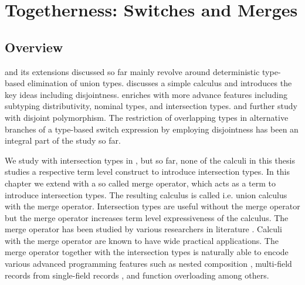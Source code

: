 
\chapter{Togetherness: Switches and Merges}
\label{chap:merge}






\section{Overview}
\name and its extensions discussed so far mainly
revolve around deterministic type-based elimination
of union types.  discusses a 
simple \name calculus and introduces the key ideas
including disjointness.  enriches 
\name with more advance features including subtyping 
distributivity, nominal types, and intersection types.
 and 
further study \name with disjoint polymorphism.
The restriction of overlapping types in alternative
branches of a type-based switch expression by employing
disjointness has been an integral part of the study so far.

We study \name with intersection types in 
, but so far, none of the calculi in
this thesis studies a respective term level construct
to introduce intersection types.
In this chapter we extend \name with a so called merge 
operator\citep{reynolds1988preliminary,dunfield2014elaborating},
which acts as a term to introduce intersection
types. The resulting calculus is called \namems i.e. union
calculus with the merge operator. Intersection types are
useful without the merge operator but the merge operator
increases term level expressiveness of the calculus.
The merge operator has been studied by various researchers
in literature \citep{oliveira2016disjoint,dunfield2014elaborating,reynolds1988preliminary,Huang:typedirected}. 
Calculi with the merge operator are known to have
wide practical applications. The merge operator
together with the intersection types is naturally
able to encode various advanced programming features
such as nested composition \citep{bi_et_al:LIPIcs:2018:9227}, 
multi-field records from single-field records 
\citep{reynolds1988preliminary}, and function overloading 
\citep{castagna1995calculus,reynolds1988preliminary} among others.

